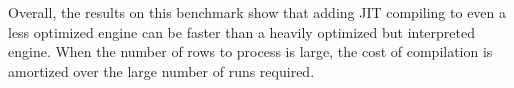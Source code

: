 Overall, the results on this benchmark show that adding JIT compiling to even a less optimized engine can be faster than a heavily optimized but interpreted engine. When the number of rows to process is large, the cost of compilation is amortized over the large number of runs required.